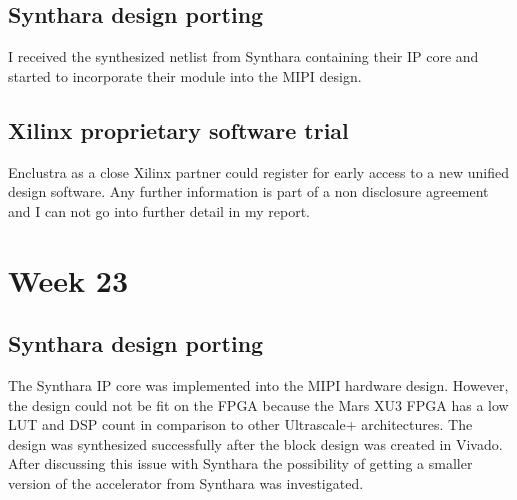 \subsection{Synthara design porting}
I received the synthesized netlist from Synthara containing their \ac{IP} core and started to incorporate their module into the \ac{MIPI} design.
\subsection{Xilinx proprietary software trial}
Enclustra as a close Xilinx partner could register for early access to a new unified design software. Any further information is part of a non disclosure agreement and I can not go into further detail in my report.

\section{Week 23}
\subsection{Synthara design porting}
The Synthara \ac{IP} core was implemented into the \ac{MIPI} hardware design. However, the design could not be fit on the \ac{FPGA} because the Mars XU3 \ac{FPGA} has a low LUT and DSP count in comparison to other Ultrascale+ architectures. The design was synthesized successfully after the block design was created in Vivado. After discussing this issue with Synthara the possibility of getting a smaller version of the accelerator from Synthara was investigated.
